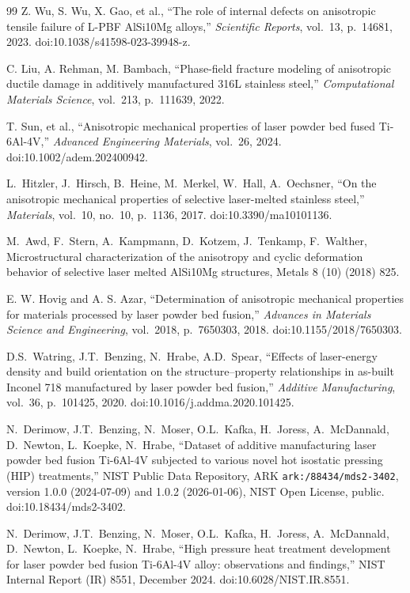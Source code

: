 \documentclass[12pt,a4paper,twocolumn]{article}
\begin{document}
\begin{thebibliography}{99}
Z. Wu, S. Wu, X. Gao, et al., ``The role of internal defects on anisotropic tensile failure of L-PBF AlSi10Mg alloys,'' \textit{Scientific Reports}, vol.~13, p.~14681, 2023. doi:10.1038/s41598-023-39948-z.

C. Liu, A. Rehman, M. Bambach, ``Phase-field fracture modeling of anisotropic ductile damage in additively manufactured 316L stainless steel,'' \textit{Computational Materials Science}, vol.~213, p.~111639, 2022.

T. Sun, et al., ``Anisotropic mechanical properties of laser powder bed fused Ti-6Al-4V,'' \textit{Advanced Engineering Materials}, vol.~26, 2024. doi:10.1002/adem.202400942.

L.~Hitzler, J.~Hirsch, B.~Heine, M.~Merkel, W.~Hall, A.~Oechsner, ``On the anisotropic mechanical properties of selective laser-melted stainless steel,'' \textit{Materials}, vol.~10, no.~10, p.~1136, 2017. doi:10.3390/ma10101136.

M.~Awd, F.~Stern, A.~Kampmann, D.~Kotzem, J.~Tenkamp, F.~Walther, Microstructural characterization of the anisotropy and cyclic deformation behavior of selective laser melted AlSi10Mg structures, Metals 8 (10) (2018) 825.

E. W. Hovig and A. S. Azar, ``Determination of anisotropic mechanical properties for materials processed by laser powder bed fusion,'' \textit{Advances in Materials Science and Engineering}, vol.~2018, p.~7650303, 2018. doi:10.1155/2018/7650303.

D.S.~Watring, J.T.~Benzing, N.~Hrabe, A.D.~Spear, ``Effects of laser-energy density and build orientation on the structure--property relationships in as-built Inconel 718 manufactured by laser powder bed fusion,'' \textit{Additive Manufacturing}, vol.~36, p.~101425, 2020. doi:10.1016/j.addma.2020.101425.

N.~Derimow, J.T.~Benzing, N.~Moser, O.L.~Kafka, H.~Joress, A.~McDannald, D.~Newton, L.~Koepke, N.~Hrabe, ``Dataset of additive manufacturing laser powder bed fusion Ti-6Al-4V subjected to various novel hot isostatic pressing (HIP) treatments,'' NIST Public Data Repository, ARK \texttt{ark:/88434/mds2-3402}, version 1.0.0 (2024-07-09) and 1.0.2 (2026-01-06), NIST Open License, public. doi:10.18434/mds2-3402.

N.~Derimow, J.T.~Benzing, N.~Moser, O.L.~Kafka, H.~Joress, A.~McDannald, D.~Newton, L.~Koepke, N.~Hrabe, ``High pressure heat treatment development for laser powder bed fusion Ti-6Al-4V alloy: observations and findings,'' NIST Internal Report (IR) 8551, December 2024. doi:10.6028/NIST.IR.8551.


\end{thebibliography}
\end{document}
